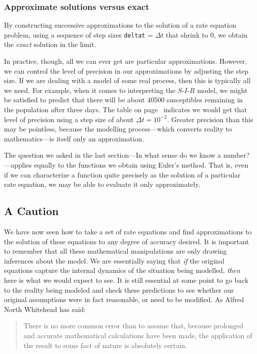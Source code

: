 \subsubsection{\bf Approximate solutions versus exact}  
\label{subsubsec:bf-approximate-solutions-versus-exact}

By constructing successive approximations to the solution of a rate
equation problem, using a sequence of step sizes {\tt deltat} =
$\Delta t$ that shrink to 0, we obtain the {\em exact\/} solution in
the limit.

In practice, though, all we can ever get are particular
approximations. However, we can control the level of precision in our
approximations by adjusting the step size.  If we are dealing with a
model of some real process, then this is typically all we need.  For
example, when it comes to interpreting the $S$-$I$-$R$ model, we might
be satisfied to predict that there will be about 40500 susceptibles
remaining in the population after three days.  The table on
page~\pageref{backwards2} indicates we would get that level of
precision using a step size of about $\Delta t = 10^{-2}$.  Greater
precision than this may be pointless, because the modelling
process---which converts reality to mathematics---is itself only an
approximation.

The question we asked in the last section---In what sense do we know a
number?---applies equally to the functions we obtain using Euler's
method.  That is, even if we can characterize a function quite
precisely as the solution of a particular rate equation, we may be
able to evaluate it only approximately.

\subsection{A Caution}
\label{subsec:a-caution}

We have now seen how to take a set of rate equations and find
approximations to the solution of these equations to any degree of
accuracy desired.  It is important to remember that all these
mathematical manipulations are only drawing inferences about the
model.  We are essentially saying that {\em if\/} the original
equations capture the internal dynamics of the situation being
modelled, {\em then\/} here is what we would expect to see.  It is
still essential at some point to go back to the reality being modeled
and check these predictions to see whether our original assumptions
were in fact reasonable, or need to be modified.  As Alfred North
Whitehead has said:
\begin{quote}
There is no more common error than to assume that, because prolonged
and accurate mathematical calculations have been made, the application
of the result to some fact of nature is absolutely certain.
\end{quote}



